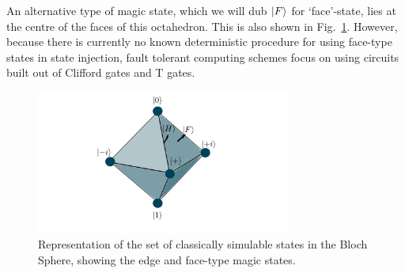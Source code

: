 \documentclass{standalone}
\begin{document}
An alternative type of magic state, which we will dub $\ket{F}$ for `face'-state, lies at the centre of the faces of this octahedron. This is also shown in Fig.~\ref{fig:octahedron}. However, because there is currently no known deterministic procedure for using face-type states in state injection, fault tolerant computing schemes focus on using circuits built out of Clifford gates and T gates.
\begin{figure}[h]
    \centering
    \includegraphics[width=0.75\textwidth]{Figures/octahedron.pdf}
\caption{Representation of the set of classically simulable states in the Bloch Sphere, showing the edge and face-type magic states.}
\label{fig:octahedron}
\end{figure}
\end{document}
